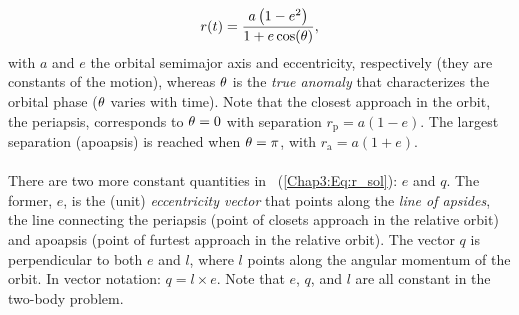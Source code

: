 \documentclass[main.tex]{subfiles}
\begin{document}
\begin{tcolorbox}[sharp corners, colback=blue!30, colframe=blue!80!blue, title=Orbital Dynamics III$^6$]
{\begin{align}
r(t) = \frac{a \left(1-e^2\right)}{1 + e \cos (\theta)},
\end{align}
with $a$ and $e$ the orbital semimajor axis and eccentricity, respectively (they are constants of the motion), whereas $\theta$ is the {\it true anomaly} that characterizes the orbital phase ($\theta$ varies with time). Note that the closest approach in the orbit, the periapsis, corresponds to $\theta=0$ with separation $r_\mathrm{p} = a(1-e)$. The largest separation (apoapsis) is reached when $\theta=\pi$, with $r_\mathrm{a} = a(1+e)$. \\ \\
There are two more constant quantities in \Eq~(\ref{Chap3:Eq:r_sol}): $\unit{e}$ and $\unit{q}$. The former, $\unit{e}$, is the (unit) {\it eccentricity vector} that points along the {\it line of apsides}, the line connecting the periapsis (point of closets approach in the relative orbit) and apoapsis (point of furtest approach in the relative orbit). The vector $\unit{q}$ is perpendicular to both $\unit{e}$ and $\unit{l}$, where $\unit{l}$ points along the angular momentum of the orbit. In vector notation: $\unit{q} = \unit{l} \times \unit{e}$. Note that $\unit{e}$, $\unit{q}$, and $\unit{l}$ are all constant in the two-body problem. }
\end{tcolorbox}
\end{document}
